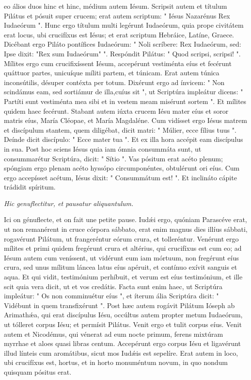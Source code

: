 eo álios duos hinc et hinc, médium autem Iésum. Scripsit autem et títulum Pilátus et pósuit super crucem; erat autem scriptum: " Iésus Nazarénus Rex Iudaeórum ". Hunc ergo títulum multi legérunt Iudaeórum, quia prope civitátem erat locus, ubi crucifíxus est Iésus; et erat scriptum Hebráice, Latíne, Graece. Dicébant ergo Piláto pontífices Iudaeórum: " Noli scríbere: Rex Iudaeórum, sed: Ipse dixit: "Rex sum Iudaeórum" ". Respóndit Pilátus: " Quod scripsi, scripsi! ". Mílites ergo cum crucifixíssent Iésum, accepérunt vestiménta eíus et fecérunt quáttuor partes, unicuíque míliti partem, et túnicam. Erat autem túnica inconsútilis, désuper contéxta per totum. Dixérunt ergo ad ínvicem: " Non scindámus eam, sed sortiámur de illa,cuíus sit ", ut Scriptúra impleátur dicens: " Partíti sunt vestiménta mea sibi et in vestem meam misérunt sortem ". Et mílites quidem haec fecérunt.  Stabant autem iúxta crucem Iésu mater eíus et soror matris eíus, María Cléopae, et María Magdaléne. Cum vidísset ergo Iésus matrem et discípulum stantem, quem diligébat, dicit matri: " Múlier, ecce fílius tuus ". Deínde dicit discípulo: " Ecce mater tua ". Et ex illa hora accépit eam discípulus in sua. Post hoc sciens Iésus quia iam ómnia consummáta sunt, ut consummarétur Scriptúra, dicit: " Sítio ". Vas pósitum erat acéto plenum; spóngiam ergo plenam acéto hyssópo circumponéntes, obtulérunt ori eíus. Cum ergo accepísset acétum, Iésus dixit: " Consummátum est! ". Et inclináto cápite trádidit spíritum.

\begin{footnotesize}\textit{\color{red} Hic genuflectitur, et pausatur aliquantulum.}\end{footnotesize}

Ici on génuflecte, et on fait une petite pause.
Iudǽi ergo, quóniam Parascéve erat, ut non remanérent in cruce córpora sábbato, erat enim magnus dies illíus sábbati, rogavérunt Pilátum, ut frangeréntur eórum crura, et tolleréntur. Venérunt ergo mílites et primi quidem fregérunt crura et altérius, qui crucifíxus est cum eo; ad Iésum autem cum veníssent, ut vidérunt eum iam mórtuum, non fregérunt eíus crura, sed unus mílitum láncea latus eíus apéruit, et contínuo exívit sanguis et aqua. Et qui vidit, testimónium perhíbuit, et verum est eíus testimónium, et ille scit quia vera dicit, ut et vos credátis. Facta sunt enim haec, ut Scriptúra impleátur: " Os non comminuétur eíus ", et íterum ália Scriptúra dicit: " Vidébunt in quem transfixérunt ". Post hæc autem rogávit Pilátum Ióseph ab Arimathǽa, qui erat discípulus Iésu, occúltus autem propter metum Iudaeórum, ut tólleret corpus Iésu; et permísit Pilátus. Venit ergo et tulit corpus eíus. Venit autem et Nicodémus, qui vénerat ad eum nocte primum, ferens mixtúram myrrhae et aloes quasi libras centum. Accepérunt ergo corpus Iésu et ligavérunt illud línteis cum aromátibus, sicut mos Iudǽis est sepelíre. Erat autem in loco, ubi crucifíxus est, hortus, et in horto monuméntum novum, in quo nondum quisquam pósitus erat.
\par
